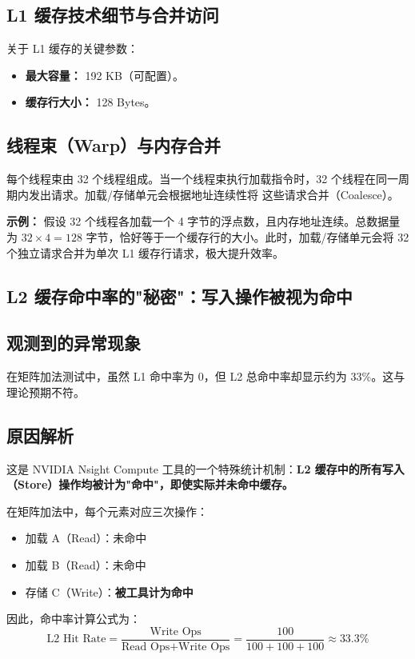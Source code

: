 \subsection{L1 缓存技术细节与合并访问}
关于 L1 缓存的关键参数：
\begin{itemize}
    \item \textbf{最大容量：} 192 KB（可配置）。
    \item \textbf{缓存行大小：} 128 Bytes。
\end{itemize}

\subsection{线程束（Warp）与内存合并}
每个线程束由 32 个线程组成。当一个线程束执行加载指令时，32 个线程在同一周期内发出请求。加载/存储单元会根据地址连续性将
这些请求合并（Coalesce）。

\textbf{示例：} 假设 32 个线程各加载一个 4 字节的浮点数，且内存地址连续。总数据量为 $32 \times 4 = 128$ 字节，恰好等于一个缓存行的大小。此时，加载/存储单元会将 32 个独立请求合并为单次 L1 缓存行请求，极大提升效率。

\subsection{L2 缓存命中率的"秘密"：写入操作被视为命中}

\subsection{观测到的异常现象}
在矩阵加法测试中，虽然 L1 命中率为 0，但 L2 总命中率却显示约为 33\%。这与理论预期不符。

\subsection{原因解析}
这是 NVIDIA Nsight Compute 工具的一个特殊统计机制：\textbf{L2 缓存中的所有写入（Store）操作均被计为"命中"，即使实际并未命中缓存。}

在矩阵加法中，每个元素对应三次操作：
\begin{itemize}
    \item 加载 A（Read）：未命中
    \item 加载 B（Read）：未命中
    \item 存储 C（Write）：\textbf{被工具计为命中}
\end{itemize}
因此，命中率计算公式为：\[\text{L2 Hit Rate} = \frac{\text{Write Ops}}
{\text{Read Ops}+ \text{Write Ops}} = \frac{100}
{100 + 100 + 100} \approx 33.3\%\]

